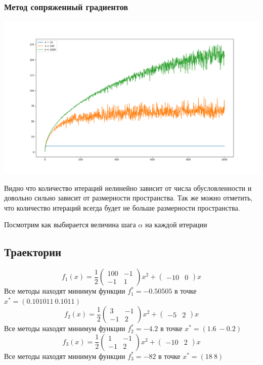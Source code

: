 \documentclass[english]{article}
\begin{document}
\subsubsection{Метод сопряженный градиентов}
\begin{center}
    \includegraphics[scale=0.4]{plots/conjugate_gradient_1.png}
\end{center}
Видно что количество итераций нелинейно зависит от числа
обусловленности и довольно сильно зависит от размерности
пространства. Так же можно отметить, что количество итераций всегда
будет не больше размерности пространства.

Посмотрим как выбирается величина шага \(\alpha\) на каждой итерации

\subsection{Траектории}
\[ f_1(x) = \frac{1}{2}\begin{pmatrix}
100 & -1 \\
-1 & 1
\end{pmatrix} x^2 + \begin{pmatrix} -10 & 0 \end{pmatrix}x\]
Все методы находят минимум функции \(f_1^* = -0.50505\) в точке \(x^* = (0.101011\ 0.1011)\)
\[ f_2(x) = \frac{1}{2}\begin{pmatrix}
3 & -1 \\
-1 & 2
\end{pmatrix} x^2 + \begin{pmatrix} -5 & 2 \end{pmatrix}x\]
Все методы находят минимум функции \(f_2^* = -4.2\) в точке \(x^* = (1.6\ -0.2)\)
\[ f_3(x) = \frac{1}{2}\begin{pmatrix}
1 & -1 \\
-1 & 2
\end{pmatrix} x^2 + \begin{pmatrix} -10 & 2 \end{pmatrix}x\]
Все методы находят минимум функции \(f_3^* = -82\) в точке \(x^* = (18\ 8)\) \\
\end{document}
